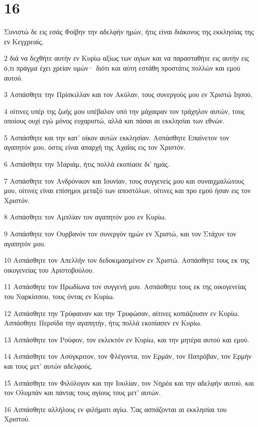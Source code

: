 \chapter{16}

\par Συνιστώ δε εις εσάς Φοίβην την αδελφήν ημών, ήτις είναι διάκονος της εκκλησίας της εν Κεγχρεαίς,
\par 2 διά να δεχθήτε αυτήν εν Κυρίω αξίως των αγίων και να παρασταθήτε εις αυτήν εις ό,τι πράγμα έχει χρείαν υμών· διότι και αύτη εστάθη προστάτις πολλών και εμού αυτού.
\par 3 Ασπάσθητε την Πρίσκιλλαν και τον Ακύλαν, τους συνεργούς μου εν Χριστώ Ιησού,
\par 4 οίτινες υπέρ της ζωής μου υπέβαλον υπό την μάχαιραν τον τράχηλον αυτών, τους οποίους ουχί εγώ μόνος ευχαριστώ, αλλά και πάσαι αι εκκλησίαι των εθνών.
\par 5 Ασπάσθητε και την κατ' οίκον αυτών εκκλησίαν. Ασπάσθητε Επαίνετον τον αγαπητόν μου, όστις είναι απαρχή της Αχαΐας εις τον Χριστόν.
\par 6 Ασπάσθητε την Μαριάμ, ήτις πολλά εκοπίασε δι' ημάς.
\par 7 Ασπάσθητε τον Ανδρόνικον και Ιουνίαν, τους συγγενείς μου και συναιχμαλώτους μου, οίτινες είναι επίσημοι μεταξύ των αποστόλων, οίτινες και προ εμού ήσαν εις τον Χριστόν.
\par 8 Ασπάσθητε τον Αμπλίαν τον αγαπητόν μου εν Κυρίω.
\par 9 Ασπάσθητε τον Ουρβανόν τον συνεργόν ημών εν Χριστώ, και τον Στάχυν τον αγαπητόν μου.
\par 10 Ασπάσθητε τον Απελλήν τον δεδοκιμασμένον εν Χριστώ. Ασπάσθητε τους εκ της οικογενείας του Αριστοβούλου.
\par 11 Ασπάσθητε τον Ηρωδίωνα τον συγγενή μου. Ασπάσθητε τους εκ της οικογενείας του Ναρκίσσου, τους όντας εν Κυρίω.
\par 12 Ασπάσθητε την Τρύφαιναν και την Τρυφώσαν, αίτινες κοπιάζουσιν εν Κυρίω. Ασπάσθητε Περσίδα την αγαπητήν, ήτις πολλά εκοπίασεν εν Κυρίω.
\par 13 Ασπάσθητε τον Ρούφον, τον εκλεκτόν εν Κυρίω, και την μητέρα αυτού και εμού.
\par 14 Ασπάσθητε τον Ασύγκριτον, τον Φλέγοντα, τον Ερμάν, τον Πατρόβαν, τον Ερμήν και τους μετ' αυτών αδελφούς.
\par 15 Ασπάσθητε τον Φιλόλογον και την Ιουλίαν, τον Νηρέα και την αδελφήν αυτού, και τον Ολυμπάν και πάντας τους αγίους τους μετ' αυτών.
\par 16 Ασπάσθητε αλλήλους εν φιλήματι αγίω. Σας ασπάζονται αι εκκλησίαι του Χριστού.
